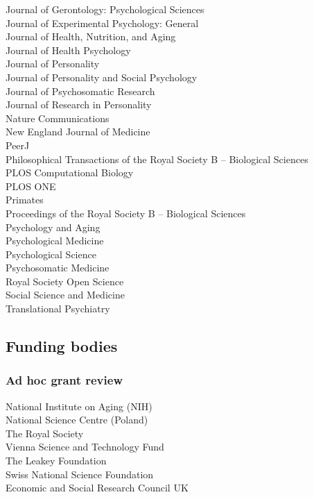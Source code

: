 \documentclass[11pt]{article}
\begin{document}
\begin{minipage}[t]{0.49\linewidth}
Journal of Gerontology: Psychological Sciences \\
Journal of Experimental Psychology: General \\
Journal of Health, Nutrition, and Aging \\
Journal of Health Psychology \\
Journal of Personality \\
Journal of Personality and Social Psychology \\
Journal of Psychosomatic Research \\
Journal of Research in Personality \\
Nature Communications \\
New England Journal of Medicine \\
PeerJ \\
Philosophical Transactions of the Royal Society B -- Biological Sciences \\
PLOS Computational Biology \\
PLOS ONE \\
Primates \\
Proceedings of the Royal Society B -- Biological Sciences \\
Psychology and Aging \\
Psychological Medicine \\
Psychological Science \\
Psychosomatic Medicine \\
Royal Society Open Science \\
Social Science and Medicine \\
Translational Psychiatry
\end{minipage}

\subsection*{Funding bodies}

\subsubsection*{Ad hoc grant review}
National Institute on Aging (NIH) \\
National Science Centre (Poland) \\
The Royal Society \\
Vienna Science and Technology Fund \\
The Leakey Foundation \\
Swiss National Science Foundation \\
Economic and Social Research Council UK
\end{document}
